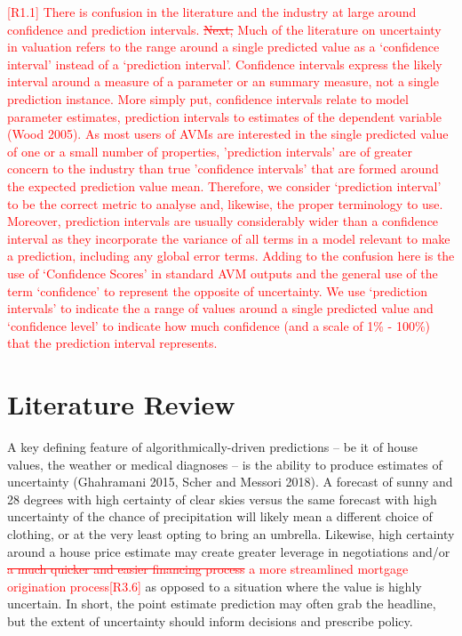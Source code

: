 \documentclass[colTwo]{anon}
\theoremstyle{definition}
\begin{document}
\textcolor{red}{[R1.1] There is confusion in the literature and the industry at large around confidence and prediction intervals. \st{Next,} Much of the literature on uncertainty in valuation refers to the range around a single predicted value as a ‘confidence interval’ instead of a ‘prediction interval’.  Confidence intervals express the likely interval around a measure of a parameter or an summary measure, not a single prediction instance. More simply put, confidence intervals relate to model parameter estimates, prediction intervals to estimates of the dependent variable (Wood 2005). As most users of AVMs are interested in the single predicted value of one or a small number of properties, 'prediction intervals' are of greater concern to the industry than true 'confidence intervals' that are formed around the expected prediction value mean. Therefore, we consider ‘prediction interval’ to be the correct metric to analyse and, likewise, the proper terminology to use.  Moreover, prediction intervals are usually considerably wider than a confidence interval as they incorporate the variance of all terms in a model relevant to make a prediction, including any global error terms. Adding to the confusion here is the use of ‘Confidence Scores’ in standard AVM outputs and the general use of the term ‘confidence’ to represent the opposite of uncertainty. We use ‘prediction intervals’ to indicate the a range of values around a single predicted value and ‘confidence level’ to indicate how much confidence (and a scale of 1\% - 100\%) that the prediction interval represents.}

\section{Literature Review}

A key defining feature of algorithmically-driven predictions -- be it of house values, the weather or medical diagnoses -- is the ability to produce estimates of uncertainty (Ghahramani 2015, Scher and Messori 2018).  A forecast of sunny and 28 degrees with high certainty of clear skies versus the same forecast with high uncertainty of the chance of precipitation will likely mean a different choice of clothing, or at the very least opting to bring an umbrella.  Likewise, high certainty around a house price estimate may create greater leverage in negotiations and/or \textcolor{red}{\st{a much quicker and easier financing process} a more streamlined mortgage origination process[R3.6]} as opposed to a situation where the value is highly uncertain.  In short, the point estimate prediction may often grab the headline, but the extent of uncertainty should inform decisions and prescribe policy.   
\end{document}
